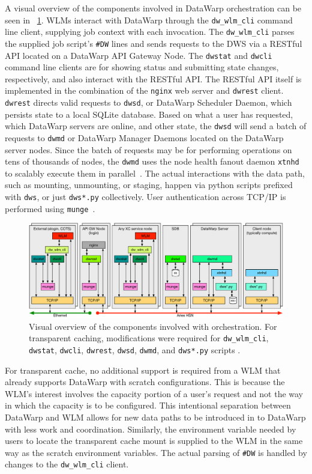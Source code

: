 \documentclass[10pt, conference, compsocconf]{IEEEtran}
\begin{document}
A visual overview of the components involved in DataWarp orchestration can be seen in \figurename~\ref{orchestration}.  WLMs interact with DataWarp through the \texttt{dw\_wlm\_cli} command line client, supplying job context with each invocation.  The \texttt{dw\_wlm\_cli} parses the supplied job script's \texttt{\#DW} lines and sends requests to the DWS via a RESTful API located on a DataWarp API Gateway Node.  The \texttt{dwstat} and \texttt{dwcli} command line clients are for showing status and submitting state changes, respectively, and also interact with the RESTful API.  The RESTful API itself is implemented in the combination of the \texttt{nginx} web server and \texttt{dwrest} client.  \texttt{dwrest} directs valid requests to \texttt{dwsd}, or DataWarp Scheduler Daemon, which persists state to a local SQLite database.  Based on what a user has requested, which DataWarp servers are online, and other state, the \texttt{dwsd} will send a batch of requests to \texttt{dwmd} or DataWarp Manager Daemons located on the DataWarp server nodes.  Since the batch of requests may be for performing operations on tens of thousands of nodes, the \texttt{dwmd} uses the node health fanout daemon \texttt{xtnhd} to scalably execute them in parallel~\cite{cug_nh}.  The actual interactions with the data path, such as mounting, unmounting, or staging, happen via python scripts prefixed with \texttt{dws}, or just \texttt{dws*.py} collectively.  User authentication across TCP/IP is performed using \texttt{munge}~\cite{munge_install}.

\begin{figure}
\centering
\includegraphics[width=\textwidth]{graphics/orchestration}
\caption{Visual overview of the components involved with orchestration.  For transparent caching, modifications were required for \texttt{dw\_wlm\_cli}, \texttt{dwstat}, \texttt{dwcli}, \texttt{dwrest}, \texttt{dwsd}, \texttt{dwmd}, and \texttt{dws*.py} scripts .\label{orchestration}}
\end{figure}

For transparent cache, no additional support is required from a WLM that already supports DataWarp with scratch configurations.  This is because the WLM's interest involves the capacity portion of a user's request and not the way in which the capacity is to be configured.  This intentional separation between DataWarp and WLM allows for new data paths to be introduced in to DataWarp with less work and coordination.  Similarly, the environment variable needed by users to locate the transparent cache mount is supplied to the WLM in the same way as the scratch environment variables.  The actual parsing of \texttt{\#DW} is handled by changes to the \texttt{dw\_wlm\_cli} client.
\end{document}
